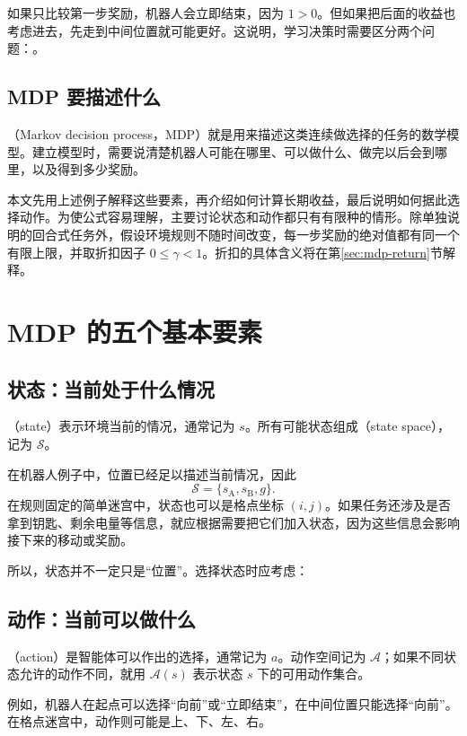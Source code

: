 \documentclass[UTF8]{ctexart}
\begin{document}
如果只比较第一步奖励，机器人会立即结束，因为 $1>0$。但如果把后面的收益也考虑进去，先走到中间位置就可能更好。这说明，学习决策时需要区分两个问题：。

\subsection{MDP 要描述什么}

（Markov decision process，MDP）就是用来描述这类连续做选择的任务的数学模型。建立模型时，需要说清楚机器人可能在哪里、可以做什么、做完以后会到哪里，以及得到多少奖励。

本文先用上述例子解释这些要素，再介绍如何计算长期收益，最后说明如何据此选择动作。为使公式容易理解，主要讨论状态和动作都只有有限种的情形。除单独说明的回合式任务外，假设环境规则不随时间改变，每一步奖励的绝对值都有同一个有限上限，并取折扣因子 $0\leq\gamma<1$。折扣的具体含义将在第\ref{sec:mdp-return}节解释。

\section{MDP 的五个基本要素}
\label{sec:mdp-elements}

\subsection{状态：当前处于什么情况}

（state）表示环境当前的情况，通常记为 $s$。所有可能状态组成（state space），记为 $\mathcal S$。

在机器人例子中，位置已经足以描述当前情况，因此
\[
  \mathcal S=\{s_{\mathrm A},s_{\mathrm B},g\}.
\]
在规则固定的简单迷宫中，状态也可以是格点坐标 $(i,j)$。如果任务还涉及是否拿到钥匙、剩余电量等信息，就应根据需要把它们加入状态，因为这些信息会影响接下来的移动或奖励。

所以，状态并不一定只是“位置”。选择状态时应考虑：

\subsection{动作：当前可以做什么}

（action）是智能体可以作出的选择，通常记为 $a$。动作空间记为 $\mathcal A$；如果不同状态允许的动作不同，就用 $\mathcal A(s)$ 表示状态 $s$ 下的可用动作集合。

例如，机器人在起点可以选择“向前”或“立即结束”，在中间位置只能选择“向前”。在格点迷宫中，动作则可能是上、下、左、右。
\end{document}
